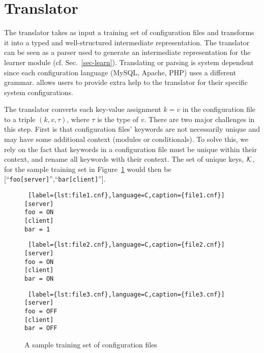 
\section{Translator}
\label{sec:trans}

The translator takes as input a training set of configuration files and transforms it into a typed and well-structured intermediate representation.
The translator can be seen as a parser used to generate an intermediate representation for the learner module (cf. Sec.~\ref{sec-learn}).
Translating or parsing is system dependent since each configuration language (MySQL, Apache, PHP) uses a different grammar.
\app allows users to provide extra help to the translator for their specific system configurations.

The translator converts each key-value assignment $k=v$ in the configuration file to a triple $(k, v, \tau)$, where $\tau$ is the type of $v$. 
There are two major challenges in this step.
First is that configuration files' keywords are not necessarily unique and may have some additional context (modules or conditionals).
To solve this, we rely on the fact that keywords in a configuration file must be unique within their context, and rename all keywords with their context.
The set of unique keys, $\mathcal{K}$, for the sample training set in Figure~\ref{fig:tset} would then be [``{\tt foo[server]}'',``{\tt bar[client]}''].

{
\setlength{\belowcaptionskip}{-15pt}
\begin{figure}[!htb]
    \centering
    \begin{minipage}{.25\textwidth}
	\begin{lstlisting} [label={lst:file1.cnf},language=C,caption={file1.cnf}]
[server]
foo = ON
[client]
bar = 1
	\end{lstlisting}
    \end{minipage}%
    \hspace{1cm}
    \begin{minipage}{0.25\textwidth}
	\begin{lstlisting} [label={lst:file2.cnf},language=C,caption={file2.cnf}]
[server]
foo = ON
[client]
bar = ON
	\end{lstlisting}
    \end{minipage}
    \hspace{1cm}
    \begin{minipage}{0.25\textwidth}
	\begin{lstlisting} [label={lst:file3.cnf},language=C,caption={file3.cnf}]
[server]
foo = OFF
[client]
bar = OFF
	\end{lstlisting}
    \end{minipage}
    \caption{A sample training set of configuration files}
    \label{fig:tset}
\end{figure}
}

